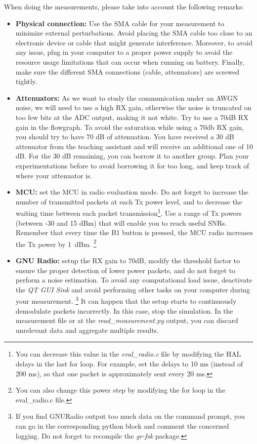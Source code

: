 When doing the measurements, please take into account the following remarks:
\begin{itemize}
    \item \textbf{Physical connection:} Use the SMA cable for your measurement to minimize external perturbations. Avoid placing the SMA cable too close to an electronic device or cable that might generate interference. Moreover, to avoid any issue, plug in your computer to a proper power supply to avoid the resource usage limitations that can occur when running on battery. Finally, make sure the different SMA connections (cable, attenuators) are screwed tightly.
    \item \textbf{Attenuators:} As we want to study the communication under an AWGN noise, we will need to use a high RX gain, otherwise the noise is truncated on too few bits at the ADC output, making it not white. Try to use a 70dB RX gain in the flowgraph. To avoid the saturation while using a 70db RX gain, you should try to have 70 dB of attenuation. You have received a 30 dB attenuator from the teaching assistant and will receive an additional one of 10 dB. For the 30 dB remaining, you can borrow it to another group. Plan your experimentations before to avoid borrowing it for too long, and keep track of where your attenuator is.
    \item \textbf{MCU:} set the MCU in radio evaluation mode. Do not forget to increase the number of transmitted packets at each Tx power level, and to decrease the waiting time between each packet transmission\footnote{You can decrease this value in the \textit{eval\_radio.c} file by modifying the HAL delays in the last for loop. For example, set the delays to 10 ms (instead of 200 ms), so that one packet is approximately sent every 20 ms.}. Use a range of Tx powers (between -30 and 15 dBm) that will enable you to reach useful SNRs. Remember that every time the B1 button is pressed, the MCU radio increases the Tx power by 1~dBm. \footnote{You can also change this power step by modifying the for loop in the {eval\_radio.c} file.}
    \item \textbf{GNU Radio:} setup the RX gain to 70dB, modify the threshold factor to ensure the proper detection of lower power packets, and do not forget to perform a noise estimation. To avoid any computational load issue, deactivate the \textit{QT GUI Sink} and avoid performing other tasks on your computer during your measurement. \footnote{If you find GNURadio output too much data on the command prompt, you can go in the corresponding python block and comment the concerned logging. Do not forget to recompile the \textit{gr-fsk} package.} It can happen that the setup starts to continuously demodulate packets incorrectly. In this case, stop the simulation. In the measurement file or at the \textit{read\_measurement.py} output, you can discard unrelevant data and aggregate multiple results.

\end{itemize}
